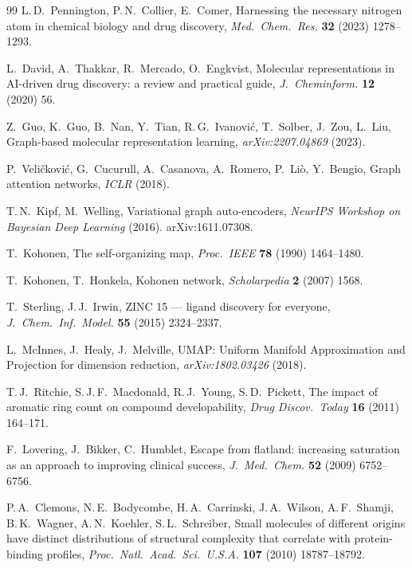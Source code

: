 \documentclass[10pt,a4paper,twocolumn]{article}
\begin{document}
\begin{thebibliography}{99}
L.\,D.~Pennington, P.\,N.~Collier, E.~Comer,
Harnessing the necessary nitrogen atom in chemical biology and drug discovery,
\textit{Med.\ Chem.\ Res.} \textbf{32} (2023) 1278--1293.

L.~David, A.~Thakkar, R.~Mercado, O.~Engkvist,
Molecular representations in AI-driven drug discovery: a review and practical guide,
\textit{J.\ Cheminform.} \textbf{12} (2020) 56.

Z.~Guo, K.~Guo, B.~Nan, Y.~Tian, R.\,G.~Ivanovi{\'c}, T.~Solber, J.~Zou, L.~Liu,
Graph-based molecular representation learning,
\textit{arXiv:2207.04869} (2023).

P.~Veli{\v{c}}kovi{\'c}, G.~Cucurull, A.~Casanova, A.~Romero, P.~Li{\`o}, Y.~Bengio,
Graph attention networks,
\textit{ICLR} (2018).

T.\,N.~Kipf, M.~Welling,
Variational graph auto-encoders,
\textit{NeurIPS Workshop on Bayesian Deep Learning} (2016). arXiv:1611.07308.

T.~Kohonen,
The self-organizing map,
\textit{Proc.\ IEEE} \textbf{78} (1990) 1464--1480.

T.~Kohonen, T.~Honkela,
Kohonen network,
\textit{Scholarpedia} \textbf{2} (2007) 1568.

T.~Sterling, J.\,J.~Irwin,
ZINC 15 --- ligand discovery for everyone,
\textit{J.\ Chem.\ Inf.\ Model.} \textbf{55} (2015) 2324--2337.

L.~McInnes, J.~Healy, J.~Melville,
UMAP: Uniform Manifold Approximation and Projection for dimension reduction,
\textit{arXiv:1802.03426} (2018).

T.\,J.~Ritchie, S.\,J.\,F.~Macdonald, R.\,J.~Young, S.\,D.~Pickett,
The impact of aromatic ring count on compound developability,
\textit{Drug Discov.\ Today} \textbf{16} (2011) 164--171.

F.~Lovering, J.~Bikker, C.~Humblet,
Escape from flatland: increasing saturation as an approach to improving clinical success,
\textit{J.\ Med.\ Chem.} \textbf{52} (2009) 6752--6756.

P.\,A.~Clemons, N.\,E.~Bodycombe, H.\,A.~Carrinski, J.\,A.~Wilson, A.\,F.~Shamji, B.\,K.~Wagner, A.\,N.~Koehler, S.\,L.~Schreiber,
Small molecules of different origins have distinct distributions of structural complexity that correlate with protein-binding profiles,
\textit{Proc.\ Natl.\ Acad.\ Sci.\ U.S.A.} \textbf{107} (2010) 18787--18792.


\end{thebibliography}
\end{document}
